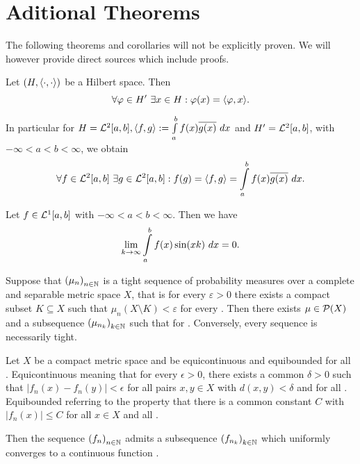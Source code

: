 \appendix
\chapter{Aditional Theorems}\label{appendix}

The following theorems and corollaries will not be explicitly proven. We will however provide direct sources which include proofs.

\begin{theorem}\label{Rie-Fre}
	Let $(H, \inner{\cdot}{\cdot})$ be a Hilbert space. Then
	\[ \forall \varphi \in H'~\exists x \in H: \varphi(x) = \inner{\varphi}{x}. \]
\end{theorem}

\begin{corollary}
	In particular for $H = \ELL{2}[a, b], \inner{f}{g} := \int\limits_a^b f(x) \conj{g(x)}~dx$ and $H' = \ELL{2}[a,b]$, with $-\infty < a < b < \infty$, we obtain
	\[ \forall f \in \ELL{2}[a,b]~\exists g \in \ELL{2}[a,b]: f(g) = \inner{f}{g} = \int\limits_a^b f(x) \conj{g(x)}~dx. \]
\end{corollary}

\begin{theorem}\label{Rie-Leb}
	Let $f \in \ELL{1}[a,b]$ with $-\infty < a < b < \infty$. Then we have
	\[ \lim\limits_{\Ninf[k]} \int\limits_a^b f(x)\sin(xk)~dx = 0. \]
\end{theorem}

\begin{theorem}\label{Prok}
	Suppose that ${(\mu_n)}_{\NinN}$ is a tight sequence of probability measures over a complete and separable metric space $X$, that is for every $\varepsilon > 0$ there exists a compact subset $K \subseteq X$ such that $\mu_n(X \setminus K) < \varepsilon$ for every \NinN. Then there exists $\mu \in \PM{X}$ and a subsequence ${(\mu_{n_k})}_{\NinN[k]}$ such that  for \Ninf[k]. Conversely, every sequence  is necessarily tight.
\end{theorem}

\begin{theorem}\label{Arz-Asc}
	Let $X$ be a compact metric space and  be equicontinuous and equibounded for all \NinN. Equicontinuous meaning that for every $\epsilon > 0$, there exists a common $\delta > 0$ such that $|f_n(x) - f_n(y)| < \epsilon$ for all pairs $x, y \in X$ with $d(x, y) < \delta$ and for all \NinN. Equibounded referring to the property that there is a common constant $C$ with $|f_n(x)| \le C$ for all $x \in X$ and all \NinN.

	Then the sequence ${(f_n)}_{\NinN}$ admits a subsequence ${(f_{n_k})}_{\NinN[k]}$ which uniformly converges to a continuous function .
\end{theorem}

